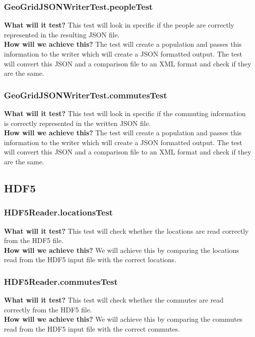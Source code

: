 \documentclass{article}
\begin{document}
\subsubsection{GeoGridJSONWriterTest.peopleTest}
\textbf{What will it test?}
This test will look in specific if the people are correctly represented in the resulting JSON file.\\
\newline
\textbf{How will we achieve this?}
The test will create a population and passes this information to the writer which will create a JSON formatted output. The test will convert this JSON and a comparison file to an XML format and check if they are the same.

\subsubsection{GeoGridJSONWriterTest.commutesTest}
\textbf{What will it test?}
This test will look in specific if the commuting information is correctly represented in the written JSON file.\\
\newline
\textbf{How will we achieve this?}
The test will create a population and passes this information to the writer which will create a JSON formatted output. The test will convert this JSON and a comparison file to an XML format and check if they are the same.

\subsection{HDF5}
\subsubsection{HDF5Reader.locationsTest}
\textbf{What will it test?}
This test will check whether the locations are read correctly from the HDF5 file. \\
\newline
\textbf{How will we achieve this?}
We will achieve this by comparing the locations read from the HDF5 input file with the correct locations.

\subsubsection{HDF5Reader.commutesTest}
\textbf{What will it test?}
This test will check whether the commutes are read correctly from the HDF5 file. \\
\newline
\textbf{How will we achieve this?}
We will achieve this by comparing the commutes read from the HDF5 input file with the correct commutes.
\end{document}
